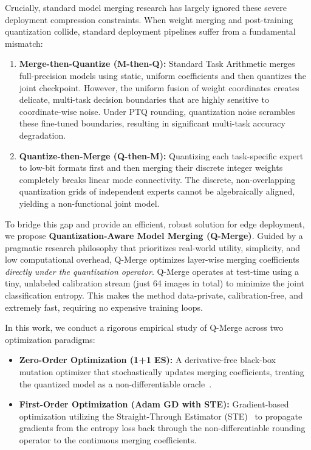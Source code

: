 Crucially, standard model merging research has largely ignored these severe deployment compression constraints. When weight merging and post-training quantization collide, standard deployment pipelines suffer from a fundamental mismatch:
\begin{enumerate}
    \item \textbf{Merge-then-Quantize (M-then-Q):} Standard Task Arithmetic merges full-precision models using static, uniform coefficients and then quantizes the joint checkpoint. However, the uniform fusion of weight coordinates creates delicate, multi-task decision boundaries that are highly sensitive to coordinate-wise noise. Under PTQ rounding, quantization noise scrambles these fine-tuned boundaries, resulting in significant multi-task accuracy degradation.
    \item \textbf{Quantize-then-Merge (Q-then-M):} Quantizing each task-specific expert to low-bit formats first and then merging their discrete integer weights completely breaks linear mode connectivity. The discrete, non-overlapping quantization grids of independent experts cannot be algebraically aligned, yielding a non-functional joint model.
\end{enumerate}

To bridge this gap and provide an efficient, robust solution for edge deployment, we propose \textbf{Quantization-Aware Model Merging (Q-Merge)}. Guided by a pragmatic research philosophy that prioritizes real-world utility, simplicity, and low computational overhead, Q-Merge optimizes layer-wise merging coefficients \emph{directly under the quantization operator}. Q-Merge operates at test-time using a tiny, unlabeled calibration stream (just 64 images in total) to minimize the joint classification entropy. This makes the method data-private, calibration-free, and extremely fast, requiring no expensive training loops.

In this work, we conduct a rigorous empirical study of Q-Merge across two optimization paradigms:
\begin{itemize}
    \item \textbf{Zero-Order Optimization (1+1 ES):} A derivative-free black-box mutation optimizer that stochastically updates merging coefficients, treating the quantized model as a non-differentiable oracle~\cite{yang2024adamerging}.
    \item \textbf{First-Order Optimization (Adam GD with STE):} Gradient-based optimization utilizing the Straight-Through Estimator (STE)~\cite{bengio2013estimating} to propagate gradients from the entropy loss back through the non-differentiable rounding operator to the continuous merging coefficients.
\end{itemize}

